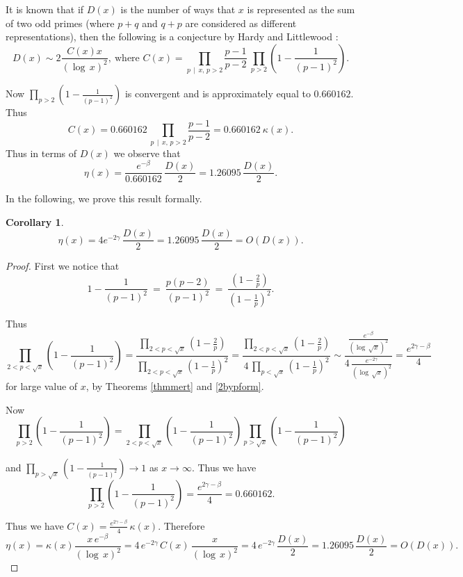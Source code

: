 \documentclass[11pt]{article}
\newtheorem{corollary}[theorem]{Corollary}
\theoremstyle{definition}
\theoremstyle{remark}
\numberwithin{equation}{section}
\newcommand{\Div}[2]{#1\,\mid\, #2}
\begin{document}
\noindent
It is known that if $D(x)$ is the number of ways that $x$ is represented as the sum of two odd primes (where $p+q$ and $q+p$ are considered as different representations), then the following is a conjecture by Hardy and Littlewood \cite{HDLW, Wu}:
$$D(x)\sim 2 \frac{C(x) x}{(\log\, x)^2},\ \text{where } C(x)=\prod\limits_{\Div{p}{x},\, p>2} \frac{p-1}{p-2}\ \prod\limits_{p>2} \left( 1-\frac{1}{(p-1)^2}\right).$$

\noindent
Now $\prod\limits_{p>2} \left( 1-\frac{1}{(p-1)^2}\right)$ is convergent and is approximately equal to $0.660162$. Thus 
$$C(x)=0.660162\, \prod\limits_{\Div{p}{x},\, p>2} \frac{p-1}{p-2}=0.660162\ \kappa(x).$$
Thus in terms of $D(x)$ we observe that
$$\eta(x)=\frac{e^{-\beta}}{0.660162}\,\frac{D(x)}{2} = 1.26095\,\frac{D(x)}{2}.$$

\noindent
In the following, we prove this result formally.

\begin{corollary}
$$\eta(x)= 4e^{-2\gamma}\,\frac{D(x)}{2}=1.26095\,\frac{D(x)}{2}=O(D(x)).$$
\end{corollary}

\begin{proof}

\noindent
First we notice that
$$1-\frac{1}{(p-1)^2}\ =\ \frac{p(p-2)}{(p-1)^2}\ =\ \frac{\left(1-\frac{2}{p}\right)}{\left(1-\frac{1}{p}\right)^2}.$$

\noindent
Thus
$$\prod\limits_{2<p<\sqrt{x}} \left(1-\frac{1}{(p-1)^2}\right)=\frac{\prod\limits_{2<p<\sqrt{x}} \left(1-\frac{2}{p}\right)}{\prod\limits_{2<p<\sqrt{x}}\left(1-\frac{1}{p}\right)^2}=\frac{\prod\limits_{2<p<\sqrt{x}} \left(1-\frac{2}{p}\right)}{4\,\prod\limits_{p<\sqrt{x}}\left(1-\frac{1}{p}\right)^2}\sim \frac{\frac{e^{-\beta}}{(\log\,\sqrt{x})^2}}{4\,\frac{e^{-2\gamma}}{(\log\,\sqrt{x})^2}}= \frac{e^{2\gamma-\beta}}{4}$$
for large value of $x$, by Theorems \ref{thmmert} and \ref{2bypform}.

\noindent
Now 
$$\prod\limits_{p>2} \left(1-\frac{1}{(p-1)^2}\right) = \prod\limits_{2<p<\sqrt{x}} \left(1-\frac{1}{(p-1)^2}\right) \prod\limits_{p>\sqrt{x}} \left(1-\frac{1}{(p-1)^2}\right)$$

\noindent
and $\prod\limits_{p>\sqrt{x}} \left(1-\frac{1}{(p-1)^2}\right)\rightarrow 1$ as $x\rightarrow\infty$. Thus we have 
$$\prod\limits_{p>2} \left(1-\frac{1}{(p-1)^2}\right) = \frac{e^{2\gamma-\beta}}{4}=0.660162.$$

\noindent
Thus we have $C(x)=\frac{e^{2\gamma-\beta}}{4}\,\kappa(x)$. Therefore
$$\eta(x)=\kappa(x) \frac{x\, e^{-\beta}}{(\log\, x)^2}=4\, e^{-2\gamma}\, C(x)\,\frac{x}{(\log\, x)^2}=4\, e^{-2\gamma}\,\frac{D(x)}{2} =1.26095\, \frac{D(x)}{2}=O(D(x)).$$

\end{proof}
\end{document}
